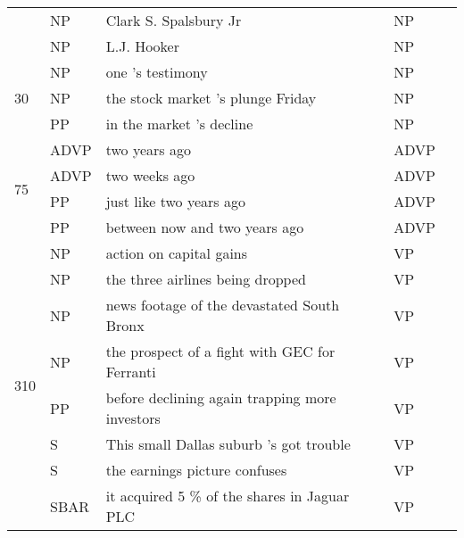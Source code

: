 \documentclass[11pt]{article}
\newcommand{\cmark}{\text{\ding{51}}}
\newcommand{\xmark}{\text{\ding{55}}}
\begin{document}
\begin{table*}[t]
\begin{center}
{\begin{tabular}{|l|l|l|l|l|}
    & NP &                              Clark S. Spalsbury Jr &        NP &    \textcolor{cadmiumgreen}{\cmark} \\
    & NP &                                        L.J. Hooker &        NP &    \textcolor{cadmiumgreen}{\cmark} \\
\hline
\multirow{3}{*}{30} & NP &                                   one 's testimony &        NP &    \textcolor{cadmiumgreen}{\cmark} \\
    & NP &                  the stock market 's plunge Friday &        NP &    \textcolor{cadmiumgreen}{\cmark} \\
    & PP &                           in the market 's decline &        NP &   \textcolor{alizarin}{\xmark} \\
\hline
\multirow{4}{*}{75} & ADVP &                                      two years ago &      ADVP &    \textcolor{cadmiumgreen}{\cmark} \\
    & ADVP &                                      two weeks ago &      ADVP &    \textcolor{cadmiumgreen}{\cmark} \\
    & PP &                            just like two years ago &      ADVP &   \textcolor{alizarin}{\xmark} \\
    & PP &                      between now and two years ago &      ADVP &   \textcolor{alizarin}{\xmark} \\
\hline
\multirow{13}{*}{310} & NP &                            action on capital gains &        VP &   \textcolor{alizarin}{\xmark} \\
    & NP &                   the three airlines being dropped &        VP &   \textcolor{alizarin}{\xmark} \\
    & NP &         news footage of the devastated South Bronx &        VP &   \textcolor{alizarin}{\xmark} \\
    & NP &      the prospect of a fight with GEC for Ferranti &        VP &   \textcolor{alizarin}{\xmark} \\
    & PP &     before declining again trapping more investors &        VP &   \textcolor{alizarin}{\xmark} \\
    & S &            This small Dallas suburb 's got trouble &        VP &   \textcolor{alizarin}{\xmark} \\
    & S &                      the earnings picture confuses &        VP &   \textcolor{alizarin}{\xmark} \\
    & SBAR &        it acquired 5 \% of the shares in Jaguar PLC &        VP &   \textcolor{alizarin}{\xmark} \\

\end{tabular}}
\end{center}
\end{table*}
\end{document}
